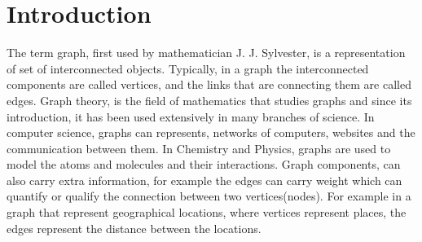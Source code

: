 \documentclass[english]{tktltiki}
\begin{document}
\mytableofcontents

\section{Introduction}
The term graph, first used by mathematician J. J. Sylvester, is a representation of set of interconnected objects. Typically, in a graph the interconnected components are called vertices, and the links that are connecting them are called edges. Graph theory, is the field of mathematics that studies graphs and since its introduction, it has been used extensively in many branches of science. In computer science, graphs can represents, networks of computers, websites and the communication between them. In Chemistry and Physics, graphs are used to model the atoms and molecules and their interactions. Graph components, can also carry extra information, for example the edges can carry weight which can quantify or qualify the connection between two vertices(nodes). For example in a graph that represent geographical locations, where vertices represent places, the edges represent the distance between the locations. \\
\end{document}
